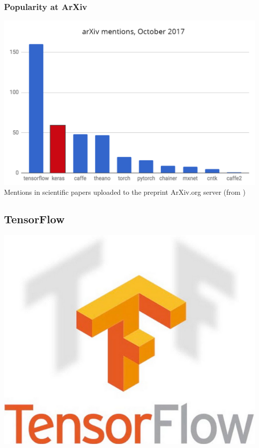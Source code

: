 \documentclass[hyperref={pdfpagelabels=false}]{beamer}
\begin{document}
       \begin{frame}
       \frametitle{Popularity at ArXiv}
       \centering
       \includegraphics[scale=0.5]{arxiv_mentions.png}
       \scriptsize{\\Mentions in scientific papers uploaded to the preprint ArXiv.org server (from \cite{keras-web})}
     \end{frame}


     \subsection{TensorFlow} %
     \begin{frame}[c] %
       \begin{center}
         \vspace{8mm}
         \includegraphics[scale=0.15]{logo_tf.png}
       \end{center}
     \end{frame}
\end{document}
